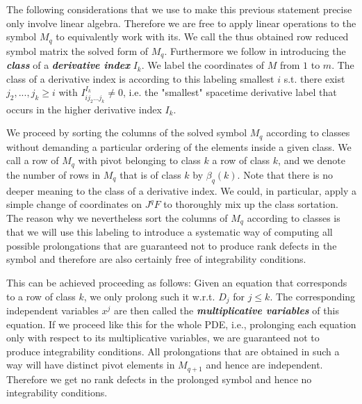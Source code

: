\documentclass[a4paper,12pt, DIV=14, BCOR=5mm, twoside, headsepline, numbers=noenddot]{scrbook}
\begin{document}
The following considerations that we use to make this previous statement precise only involve linear algebra. Therefore we are free to apply linear operations to the symbol $M_q$ to equivalently work with its. We call the thus obtained row reduced symbol matrix the solved form of $M_q$. Furthermore we follow \cite{seiler1994analysis} in introducing the \textit{\textbf{class}} of a \textit{\textbf{derivative index}} $I_k$. We label the coordinates of $M$ from $1$ to $m$. The class of a derivative index is according to this labeling smallest $i$ s.t. there exist $j_2,...,j_k\geq i$ with $I^{I_k}_{ij_2...j_k} \neq 0$, i.e. the "smallest" spacetime derivative label that occurs in the higher derivative index $I_k$.

We proceed by sorting the columns of the solved symbol $M_q$ according to classes without demanding a particular ordering of the elements inside a given class. We call a row of $M_q$ with pivot belonging to class $k$ a row of class $k$, and we denote the number of rows in $M_q$ that is of class $k$ by $\beta_q(k)$. Note that there is no deeper meaning to the class of a derivative index. We could, in particular, apply a simple change of coordinates on $J^qF$ to thoroughly mix up the class sortation. The reason why we nevertheless sort the columns of $M_q$ according to classes is that we will use this labeling to introduce a systematic way of computing all possible prolongations that are guaranteed not to produce rank defects in the symbol and therefore are also certainly free of integrability conditions.

This can be achieved proceeding as follows:
Given an equation that corresponds to a row of class $k$, we only prolong such it w.r.t. $D_j$ for  $j \leq k$. The corresponding independent variables $x^j$ are then called the \textbf{\textit{multiplicative variables}} of this equation. If we proceed like this for the whole PDE, i.e., prolonging each equation only with respect to its multiplicative variables, we are guaranteed not to produce integrability conditions. All prolongations that are obtained in such a way will have distinct pivot elements in $M_{q+1}$ and hence are independent. Therefore we get no rank defects in the prolonged symbol and hence no integrability conditions.
\end{document}
